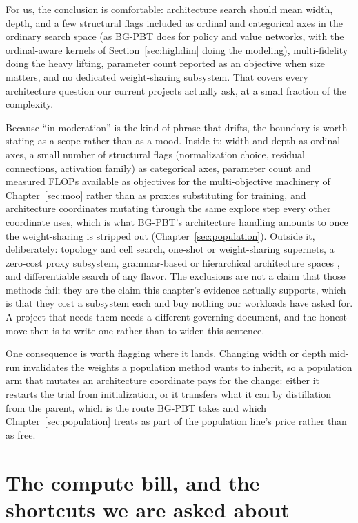 For us, the conclusion is comfortable: architecture search should mean
width, depth, and a few structural flags included as ordinal and
categorical axes in the ordinary search space (as BG-PBT does for policy
and value networks, with the ordinal-aware kernels of
Section~\ref{sec:highdim} doing the modeling), multi-fidelity doing the
heavy lifting, parameter count reported as an objective when size
matters, and no dedicated weight-sharing subsystem. That covers every
architecture question our current projects actually ask, at a small
fraction of the complexity.

Because ``in moderation'' is the kind of phrase that drifts, the
boundary is worth stating as a scope rather than as a mood. Inside it:
width and depth as ordinal axes, a small number of structural flags
(normalization choice, residual connections, activation family) as
categorical axes, parameter count and measured FLOPs available as
objectives for the multi-objective machinery of
Chapter~\ref{sec:moo} rather than as proxies substituting for
training, and architecture coordinates mutating through the same
explore step every other coordinate uses, which is what BG-PBT's
architecture handling amounts to once the weight-sharing is stripped
out (Chapter~\ref{sec:population}). Outside it, deliberately: topology
and cell search, one-shot or weight-sharing supernets, a zero-cost
proxy subsystem, grammar-based or hierarchical architecture spaces
\citep{schrodi2023grammar}, and differentiable search of any flavor.
The exclusions are not a claim that those methods fail; they are the
claim this chapter's evidence actually supports, which is that they
cost a subsystem each and buy nothing our workloads have asked for. A
project that needs them needs a different governing document, and the
honest move then is to write one rather than to widen this sentence.

One consequence is worth flagging where it lands. Changing width or
depth mid-run invalidates the weights a population method wants to
inherit, so a population arm that mutates an architecture coordinate
pays for the change: either it restarts the trial from initialization,
or it transfers what it can by distillation from the parent, which is
the route BG-PBT takes \citep{wan2022bgpbt} and which
Chapter~\ref{sec:population} treats as part of the population line's
price rather than as free.

\section{The compute bill, and the shortcuts we are asked about}
\label{sec:computebill}

